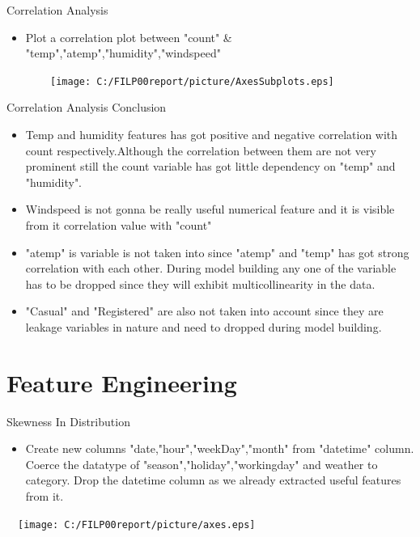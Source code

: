 \documentclass[
 size=14pt,
 paper=smartboard,  %
 mode=present, 		%
 display=slides, 	%
 style=tuliplab,  	%
 pauseslide,
 fleqn,leqno]{powerdot}
\begin{document}
\begin{slide}[toc=,bm=]{Correlation Analysis}
\begin{itemize}
\item
Plot a correlation plot between "count" \& "temp","atemp","humidity","windspeed"
\end{itemize}
\vspace{-1.0cm}

\begin{figure}
  \centering
  \texttt{[image: C:/FILP00report/picture/AxesSubplots.eps]}

\end{figure}

\end{slide}
\begin{slide}{Correlation Analysis Conclusion}
\begin{itemize}
\item
Temp and humidity features has got positive and negative correlation with count respectively.Although the correlation between them are not very prominent still the count variable has got little dependency on "temp" and "humidity".
\item
Windspeed is not gonna be really useful numerical feature and it is visible from it correlation value with "count"
\item
"atemp" is variable is not taken into since "atemp" and "temp" has got strong correlation with each other. During model building any one of the variable has to be dropped since they will exhibit multicollinearity in the data.
\item
"Casual" and "Registered" are also not taken into account since they are leakage variables in nature and need to dropped during model building.
\end{itemize}
\end{slide}

\section{Feature Engineering}
\begin{slide}[toc=,bm=]{Skewness In Distribution}
\begin{itemize}
\item
Create new columns "date,"hour","weekDay","month" from "datetime" column.
Coerce the datatype of "season","holiday","workingday" and weather to category.
Drop the datetime column as we already extracted useful features from it.
\end{itemize}
\begin{center}
  \texttt{[image: C:/FILP00report/picture/axes.eps]}
\end{center}
\end{slide}
\end{document}
